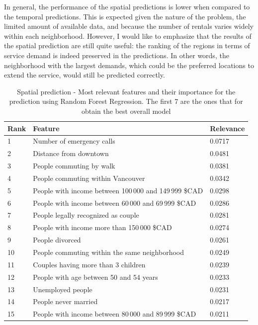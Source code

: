 In general, the performance of the spatial predictions is lower when compared to the temporal predictions. This is expected given the nature of the problem, the limited amount of available data, and because the number of rentals varies widely within each neighborhood. However, I would like to emphasize that the results of the spatial prediction are still quite useful: the ranking of the regions in terms of service demand is indeed preserved in the predictions. In other words, the neighborhood with the largest demands, which could be the preferred locations to extend the service, would still be predicted correctly.



\begin{table}
\centering
\begin{tabular}{lll}
\toprule
\textbf{Rank} & \textbf{Feature}&\textbf{Relevance} \\ \midrule
1  & Number of emergency calls       & 0.0717             \\ \hline
2  & Distance from downtown  & 0.0481             \\ \hline
3  & People commuting by walk           & 0.0381    \\ \hline
4  & People commuting within Vancouver      & 0.0342   \\ \hline
5  & People with income between  100\,000 and 149\,999 \$CAD   & 0.0298 \\ \hline
6  & People with income between  60\,000 and 69\,999 \$CAD     & 0.0286       \\ \hline
7  & People legally recognized as couple   & 0.0281             \\ \hline
8  & People with income more than 150\,000 \$CAD & 0.0274             \\ \hline
9  & People divorced  & 0.0261             \\ \hline
10  & People commuting within the same neighborhood & 0.0249    \\ \hline
11 & Couples having more than 3 children   & 0.0239             \\ \hline
12 & People with age between 50 and 54 years & 0.0233             \\ \hline
13 &  Unemployed people   & 0.0231   \\ \hline
14  & People never married  & 0.0217             \\ \hline
15  & People with income between  80\,000 and 89\,999 \$CAD  & 0.0211  \\ 
\bottomrule
\end{tabular}
\caption{Spatial prediction - Most relevant features and their importance for the prediction using Random Forest Regression. The first 7 are the ones that for obtain the best overall model}
\label{tab:8_5_featuresranking}
\end{table}

